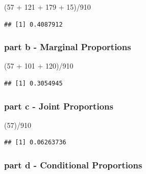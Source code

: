 \documentclass[
]{article}
\newenvironment{Shaded}{\begin{snugshade}}{\end{snugshade}}
\newcommand{\DecValTok}[1]{\textcolor[rgb]{0.00,0.00,0.81}{#1}}
\newcommand{\NormalTok}[1]{#1}
\newcommand{\SpecialCharTok}[1]{\textcolor[rgb]{0.00,0.00,0.00}{#1}}
\begin{document}
\begin{Shaded}
\begin{Highlighting}[]
\NormalTok{(}\DecValTok{57} \SpecialCharTok{+} \DecValTok{121} \SpecialCharTok{+} \DecValTok{179} \SpecialCharTok{+} \DecValTok{15}\NormalTok{)}\SpecialCharTok{/}\DecValTok{910}
\end{Highlighting}
\end{Shaded}

\begin{verbatim}
## [1] 0.4087912
\end{verbatim}

\hypertarget{part-b---marginal-proportions}{%
\subsubsection{\texorpdfstring{part b - \textbf{Marginal
Proportions}}{part b - Marginal Proportions}}\label{part-b---marginal-proportions}}

\begin{Shaded}
\begin{Highlighting}[]
\NormalTok{(}\DecValTok{57} \SpecialCharTok{+} \DecValTok{101} \SpecialCharTok{+} \DecValTok{120}\NormalTok{)}\SpecialCharTok{/}\DecValTok{910}
\end{Highlighting}
\end{Shaded}

\begin{verbatim}
## [1] 0.3054945
\end{verbatim}

\hypertarget{part-c---joint-proportions}{%
\subsubsection{\texorpdfstring{part c - \textbf{Joint
Proportions}}{part c - Joint Proportions}}\label{part-c---joint-proportions}}

\begin{Shaded}
\begin{Highlighting}[]
\NormalTok{(}\DecValTok{57}\NormalTok{)}\SpecialCharTok{/}\DecValTok{910}
\end{Highlighting}
\end{Shaded}

\begin{verbatim}
## [1] 0.06263736
\end{verbatim}

\hypertarget{part-d---conditional-proportions}{%
\subsubsection{\texorpdfstring{part d - \textbf{Conditional
Proportions}}{part d - Conditional Proportions}}\label{part-d---conditional-proportions}}
\end{document}
